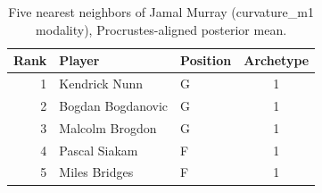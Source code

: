 \begin{table}[htbp]
  \centering\small
  \begin{tabular}{rllc}
    \toprule
    Rank & Player & Position & Archetype \\
    \midrule
    1 & Kendrick Nunn & G & 1 \\
    2 & Bogdan Bogdanovic & G & 1 \\
    3 & Malcolm Brogdon & G & 1 \\
    4 & Pascal Siakam & F & 1 \\
    5 & Miles Bridges & F & 1 \\
    \bottomrule
  \end{tabular}
  \caption{Five nearest neighbors of Jamal Murray (curvature_m1 modality), Procrustes-aligned posterior mean.}
  \label{tab:Jamal_Murray_neighbors_curvature_m1}
\end{table}

